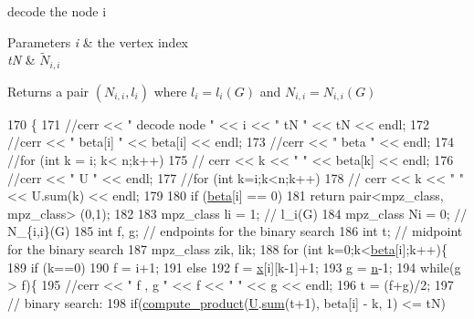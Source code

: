 decode the node i 


\begin{DoxyParams}{Parameters}
{\em i} & the vertex index \\
\hline
{\em tN} & $\tilde{N}_{i,i}$ \\
\hline
\end{DoxyParams}
\begin{DoxyReturn}{Returns}
a pair $(N_{i,i}, l_i)$ where $l_i = l_i(G)$ and $N_{i,i} = N_{i,i}(G)$ 
\end{DoxyReturn}

\begin{DoxyCode}
170 \{
171   \textcolor{comment}{//cerr << " decode node " << i << " tN " << tN << endl;}
172   \textcolor{comment}{//cerr << " beta[i] " << beta[i] << endl;}
173   \textcolor{comment}{//cerr << " beta " << endl;}
174   \textcolor{comment}{//for (int k = i; k< n;k++)}
175   \textcolor{comment}{//  cerr << k << " " << beta[k] << endl;}
176   \textcolor{comment}{//cerr << " U " << endl;}
177   \textcolor{comment}{//for (int k=i;k<n;k++)}
178   \textcolor{comment}{//  cerr << k << " " << U.sum(k) << endl;}
179 
180   \textcolor{keywordflow}{if} (\hyperlink{classgraph__decoder_aa57c11e4c09c52101682ff83286162f7}{beta}[i] == 0)
181     \textcolor{keywordflow}{return} pair<mpz\_class, mpz\_class> (0,1);
182 
183   mpz\_class li = 1; \textcolor{comment}{// l\_i(G)}
184   mpz\_class Ni = 0; \textcolor{comment}{// N\_\{i,i\}(G)}
185   \textcolor{keywordtype}{int} f, g; \textcolor{comment}{// endpoints for the binary search}
186   \textcolor{keywordtype}{int} t; \textcolor{comment}{// midpoint for the binary search}
187   mpz\_class zik, lik; 
188   \textcolor{keywordflow}{for} (\textcolor{keywordtype}{int} k=0;k<\hyperlink{classgraph__decoder_aa57c11e4c09c52101682ff83286162f7}{beta}[i];k++)\{
189     \textcolor{keywordflow}{if} (k==0)
190       f = i+1;
191     \textcolor{keywordflow}{else}
192       f = \hyperlink{classgraph__decoder_aa3f2776afe387668cf7f68109428e14e}{x}[i][k-1]+1;
193     g = \hyperlink{classgraph__decoder_a6bc1e72b2f7a913d14b789a6c2d92c1e}{n}-1;
194     \textcolor{keywordflow}{while}(g > f)\{
195       \textcolor{comment}{//cerr << " f , g " << f << " " << g << endl;}
196       t = (f+g)/2;
197       \textcolor{comment}{// binary search:}
198       \textcolor{keywordflow}{if}(\hyperlink{compression__helper_8cpp_ae2afb43aabe50f7d42aae8f82b5a35f4}{compute\_product}(\hyperlink{classgraph__decoder_a2fa9fec2cef06aaa410e57fb59d5c1ad}{U}.\hyperlink{classreverse__fenwick__tree_a672731fd6395b4853430073a099a80e6}{sum}(t+1), beta[i] - k, 1) <= tN)

\end{DoxyCode}
